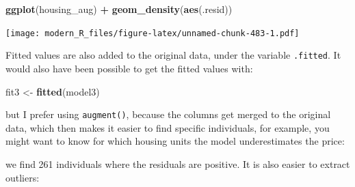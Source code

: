 \documentclass[]{gitbook}
\newenvironment{Shaded}{\begin{snugshade}}{\end{snugshade}}
\newcommand{\DataTypeTok}[1]{\textcolor[rgb]{0.13,0.29,0.53}{#1}}
\newcommand{\DecValTok}[1]{\textcolor[rgb]{0.00,0.00,0.81}{#1}}
\newcommand{\FloatTok}[1]{\textcolor[rgb]{0.00,0.00,0.81}{#1}}
\newcommand{\KeywordTok}[1]{\textcolor[rgb]{0.13,0.29,0.53}{\textbf{#1}}}
\newcommand{\NormalTok}[1]{#1}
\newcommand{\OperatorTok}[1]{\textcolor[rgb]{0.81,0.36,0.00}{\textbf{#1}}}
\newcommand{\StringTok}[1]{\textcolor[rgb]{0.31,0.60,0.02}{#1}}
\begin{document}
\begin{Shaded}
\begin{Highlighting}[]
\KeywordTok{ggplot}\NormalTok{(housing_aug) }\OperatorTok{+}
\StringTok{  }\KeywordTok{geom_density}\NormalTok{(}\KeywordTok{aes}\NormalTok{(.resid))}
\end{Highlighting}
\end{Shaded}

\texttt{[image: modern\_R\_files/figure-latex/unnamed-chunk-483-1.pdf]}

Fitted values are also added to the original data, under the variable \texttt{.fitted}. It would also have
been possible to get the fitted values with:

\begin{Shaded}
\begin{Highlighting}[]
\NormalTok{fit3 <-}\StringTok{ }\KeywordTok{fitted}\NormalTok{(model3)}
\end{Highlighting}
\end{Shaded}

but I prefer using \texttt{augment()}, because the columns get merged to the original data, which then
makes it easier to find specific individuals, for example, you might want to know for which housing
units the model underestimates the price:

\begin{Shaded}
\end{Shaded}

we find 261 individuals where the residuals are positive. It is also easier to
extract outliers:

\begin{Shaded}
\end{Shaded}
\end{document}
